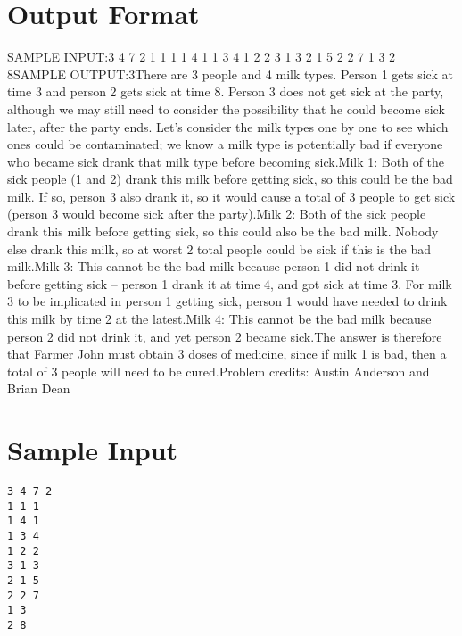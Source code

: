 \documentclass[12pt]{article}
\begin{document}
\section*{Output Format}
SAMPLE INPUT:3 4 7 2
1 1 1
1 4 1
1 3 4
1 2 2
3 1 3
2 1 5
2 2 7
1 3
2 8SAMPLE OUTPUT:3There are 3 people and 4 milk types.  Person 1 gets sick at time 3
and person 2 gets sick at time 8.  Person 3 does not get sick at the
party, although we may still need to consider the possibility that
he could become sick later, after the party ends.  Let's consider
the milk types one by one to see which ones could be contaminated; we
know a milk type is potentially bad if everyone who became sick drank
that milk type before becoming sick.Milk 1: Both of the sick people (1 and 2) drank this milk before
getting sick, so this could be the bad milk.  If so, person 3 also
drank it, so it would cause a total of 3 people to get sick (person 3
would become sick after the party).Milk 2: Both of the sick people drank this milk before getting
sick, so this could also be the bad milk.  Nobody else drank this
milk, so at worst 2 total people could be sick if this is the bad
milk.Milk 3: This cannot be the bad milk because person 1 did not drink
it before getting sick -- person 1 drank it at time 4, and got sick at
time 3.  For milk 3 to be implicated in person 1 getting sick, person
1 would have needed to drink this milk by time 2 at the latest.Milk 4: This cannot be the bad milk because person 2 did not drink
it, and yet person 2 became sick.The answer is therefore that Farmer John must obtain 3 doses of
medicine, since if milk 1 is bad, then a total of 3 people will need
to be cured.Problem credits: Austin Anderson and Brian Dean

\section*{Sample Input}
\begin{verbatim}
3 4 7 2
1 1 1
1 4 1
1 3 4
1 2 2
3 1 3
2 1 5
2 2 7
1 3
2 8
\end{verbatim}
\end{document}
